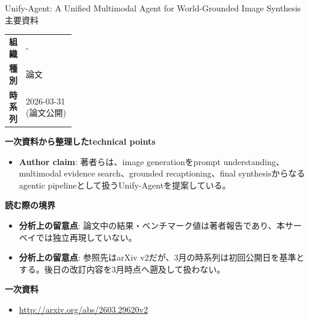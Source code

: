 \begin{technicalnote}{Unify-Agent: A Unified Multimodal Agent for World-Grounded Image Synthesis}{主要資料}
\begingroup
\begin{tabularx}{\linewidth}{@{}>{\bfseries}p{0.22\linewidth}X@{}}
組織 & - \\
種別 & 論文 \\
時系列 & 2026-03-31 (論文公開) \\
\end{tabularx}
\smallskip
{\bfseries 一次資料から整理したtechnical points}
\begin{itemize}[leftmargin=1.5em,itemsep=0.35em]
\item \textbf{Author claim}: 著者らは、image generationをprompt understanding、multimodal evidence search、grounded recaptioning、final synthesisからなるagentic pipelineとして扱うUnify-Agentを提案している。
\end{itemize}
\begin{minipage}{\linewidth}
{\bfseries 読む際の境界}
\begin{itemize}[leftmargin=1.5em,itemsep=0.35em]
\item \textbf{分析上の留意点}: 論文中の結果・ベンチマーク値は著者報告であり、本サーベイでは独立再現していない。
\item \textbf{分析上の留意点}: 参照先はarXiv v2だが、3月の時系列は初回公開日を基準とする。後日の改訂内容を3月時点へ遡及して扱わない。
\end{itemize}
\begin{samepage}
{\bfseries 一次資料}
\begingroup\sloppy
\begin{itemize}[leftmargin=1.5em,itemsep=0.25em]
\item {\scriptsize\url{http://arxiv.org/abs/2603.29620v2}}
\end{itemize}
\endgroup
\end{samepage}
\end{minipage}
\endgroup
\end{technicalnote}
\medskip

